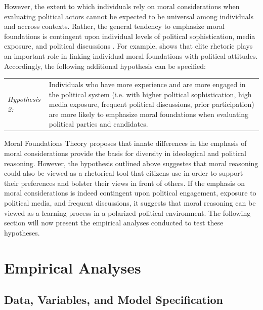 \documentclass[12pt]{article}
\begin{document}
However, the extent to which individuals rely on moral considerations when evaluating political actors cannot be expected to be universal among individuals and accross contexts. Rather, the general tendency to emphasize moral foundations is contingent upon individual levels of political sophistication, media exposure, and political discussions \citep[see also][]{goren2001core,goren2004political}. For example, \citet{clifford2015concerns} shows that elite rhetoric plays an important role in linking individual moral foundations with political attitudes. Accordingly, the following additional hypothesis can be specified:

%
%

\vspace{0.3cm}
\begin{tabular}{lp{12cm}}
\textsl{Hypothesis 2:} & Individuals who have more experience and are more engaged in the political system (i.e. with higher political sophistication, high media exposure, frequent political discussions, prior participation) are more likely to emphasize moral foundations when evaluating political parties and candidates.
\end{tabular}
\vspace{0.5cm}

Moral Foundations Theory proposes that innate differences in the emphasis of moral considerations provide the basis for diversity in ideological and political reasoning. However, the hypothesis outlined above suggestes that moral reasoning could also be viewed as a rhetorical tool that citizens use in order to support their preferences and bolster their views in front of others. If the emphasis on moral considerations is indeed contingent upon political engagement, exposure to political media, and frequent discussions, it suggests that moral reasoning can be viewed as a learning process in a polarized political environment. The following section will now present the empirical analyses conducted to test these hypotheses.


\section{Empirical Analyses}

\subsection{Data, Variables, and Model Specification}
\end{document}
